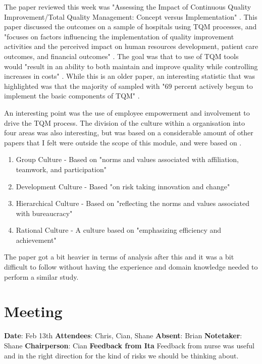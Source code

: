 The paper reviewed this week was "Assessing the Impact of Continuous Quality Improvement/Total Quality Management: Concept versus Implementation" \parencite{tqm}. This paper discussed the outcomes on a sample of hospitals using TQM processes, and "focuses on factors influencing the implementation of quality improvement activities and the perceived impact on human resources development, patient care outcomes, and financial outcomes" \parencite{tqm}. The goal was that to use of TQM tools would "result in an ability to both maintain and improve quality while controlling increases in costs" \parencite{tqm}. While this is an older paper, an interesting statistic that was highlighted was that the majority of sampled with "69 percent actively begun to implement the basic components of TQM" \parencite{tqm}.

An interesting point was the use of employee empowerment and involvement to drive the TQM process. The division of the culture within a organisation into four areas was also interesting, but was based on a considerable amount of other papers that I felt were outside the scope of this module, and were based on \parencite{quinn}. 

\begin{enumerate}
\item Group Culture - Based on "norms and values associated with affiliation, teamwork, and participation" \parencite{tqm}
\item Development Culture - Based "on risk taking innovation and change" \parencite{tqm}
\item Hierarchical Culture - Based on "reflecting the norms and values associated with bureaucracy" \parencite{tqm}
\item Rational Culture - A culture based on "emphasizing efficiency and achievement"\parencite{tqm}
\end{enumerate}

The paper got a bit heavier in terms of analysis after this and it was a bit difficult to follow without having the experience and domain knowledge needed to perform a similar study.

\section{Meeting}
\textbf{Date}: Feb 13th\newline
\textbf{Attendees}: Chris, Cian, Shane\newline
\textbf{Absent}: Brian\newline
\textbf{Notetaker}: Shane\newline
\textbf{Chairperson}: Cian\newline \newline
\textbf{Feedback from Ita} \newline \newline
Feedback from nurse was useful and in the right direction for the kind of risks we should be thinking about.

